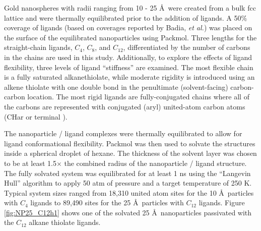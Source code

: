 Gold nanospheres with radii ranging from 10 - 25 \AA\ were created
from a bulk fcc lattice and were thermally equilibrated prior to the
addition of ligands. A 50\% coverage of ligands (based on coverages
reported by Badia, \textit{et al.}\cite{Badia1996:2}) was placed on
the surface of the equilibrated nanoparticles using
Packmol\cite{packmol}. Three lengths for the
straight-chain ligands, $C_4$, $C_8$, and $C_{12}$, differentiated by
the number of carbons in the chains are used in this study.  Additionally, to explore the
effects of ligand flexibility, three levels of ligand
``stiffness'' are examined.  The most flexible chain is a fully saturated
alkanethiolate, while moderate rigidity is introduced using an alkene
thiolate with one double bond in the penultimate (solvent-facing)
carbon-carbon location.  The most rigid ligands are fully-conjugated
chains where all of the carbons are represented with conjugated (aryl)
united-atom carbon atoms (CHar or terminal ).

The nanoparticle / ligand complexes were thermally equilibrated to
allow for ligand conformational flexibility. Packmol was then used to
solvate the structures inside a spherical droplet of hexane. The
thickness of the solvent layer was chosen to be at least 1.5$\times$
the combined radius of the nanoparticle / ligand structure. The fully
solvated system was equilibrated for at least 1 ns using the
``Langevin Hull'' algorithm to apply 50 atm of pressure and a target
temperature of 250 K.\cite{Vardeman2011} Typical system sizes ranged
from 18,310 united atom sites for the 10 \AA\ particles with $C_4$
ligands to 89,490 sites for the 25 \AA\ particles with $C_{12}$
ligands.  Figure \ref{fig:NP25_C12h1} shows one of the solvated 25
\AA\ nanoparticles passivated with the $C_{12}$ alkane thiolate
ligands.

